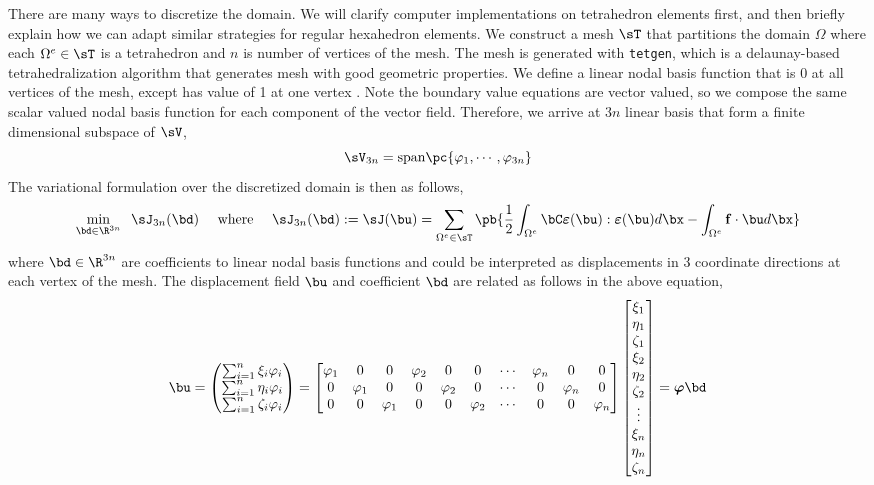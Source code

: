 \documentclass[11pt,titlepage]{article}
\newcommand{\bepsilon}{\boldsymbol{\varepsilon}}
\renewcommand{\bf}{\mathbf{f}}
\renewcommand{\bphi}{\boldsymbol{\varphi}}
\begin{document}
There are many ways to discretize the domain. We will clarify computer implementations on tetrahedron elements first, and then briefly explain how we can adapt similar strategies for regular hexahedron elements. We construct a mesh $\sT$ that partitions the domain $\Omega$ where each $\Omega^e \in\sT$ is a tetrahedron and $n$ is number of vertices of the mesh. The mesh is generated with \texttt{tetgen}, which is a delaunay-based tetrahedralization algorithm that generates mesh with good geometric properties. We define a linear nodal basis function that is 0 at all vertices of the mesh, except has value of 1 at one vertex . Note the boundary value equations are vector valued, so we compose the same scalar valued nodal basis function for each component of the vector field. Therefore, we arrive at $3n$ linear basis that form a finite dimensional subspace of $\sV$,
\[
    \sV_{3n} = \text{span} \pc{
        \varphi_1, \cdots, \varphi_{3n}
    }
\]
The variational formulation over the discretized domain is then as follows,
\[
    \min_{ \bd\in \R^{3n}} \;\; \sJ_{3n}(\bd)
        \quad\text{ where }\quad
        \sJ_{3n}(\bd) := \sJ(\bu) = 
        \sum_{\Omega^e \in \sT} \pb{
            \frac{1}{2}\int_{\Omega^e} \bC \bepsilon(\bu) : \bepsilon(\bu) d\bx 
            - \int_{\Omega^e} \bf \cdot\bu d\bx
        }
\]
where $\bd\in\R^{3n}$ are coefficients to linear nodal basis functions and could be interpreted as displacements in 3 coordinate directions at each vertex of the mesh. The displacement field $\bu$ and coefficient $\bd$ are related as follows in the above equation,
\[
    \bu = 
    \begin{pmatrix}
        \sum_{i=1}^n \xi_i \varphi_i \\
        \sum_{i=1}^n \eta_i \varphi_i \\
        \sum_{i=1}^n \zeta_i \varphi_i \\
    \end{pmatrix}
    =
    \begin{bmatrix}
        \varphi_1 & 0 & 0 & \varphi_2 & 0 & 0 & \cdots & \varphi_{n} & 0 & 0 \\
        0 & \varphi_1 & 0 & 0 & \varphi_2 & 0 & \cdots & 0 & \varphi_{n} & 0 \\
        0 & 0 & \varphi_1 & 0 & 0 & \varphi_2 & \cdots & 0 & 0 & \varphi_{n} \\
    \end{bmatrix}
    \begin{bmatrix}
        \xi_1 \\ \eta_1 \\ \zeta_1 \\
        \xi_2 \\ \eta_2 \\ \zeta_2 \\
        \vdots \\
        \xi_{n} \\ \eta_{n} \\ \zeta_{n} \\
    \end{bmatrix}
    = \bphi \bd
\]
\end{document}
